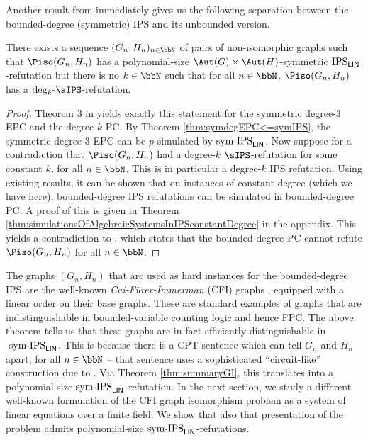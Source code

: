 \documentclass[a4paper,UKenglish,cleveref, autoref, thm-restate]{lipics-v2021}
\newcommand{\IPSlin}{\text{\upshape IPS}_{\mathsf{LIN}}}
\newcommand{\symIPSlin}{\text{ \upshape sym-IPS}_{\mathsf{LIN}}}
\begin{document}
Another result from \cite{Pago} immediately gives us the following separation between the bounded-degree (symmetric) IPS and its unbounded version.
\begin{theorem}
	\label{thm:separationOfSymBoundedDegree}
	There exists a sequence $(G_n,H_n)_{n \in \bbN}$ of pairs of non-isomorphic graphs such that $\Piso(G_n,H_n)$ has a polynomial-size $\Aut(G) \times \Aut(H)$-symmetric $\IPSlin$-refutation but there is no $k \in \bbN$ such that for all $n \in \bbN$, $\Piso(G_n,H_n)$ has a $\mathrm{deg}_k\text{-}\sIPS$-refutation.
\end{theorem}	
\begin{proof}
	Theorem 3 in \cite{Pago} yields exactly this statement for the symmetric degree-$3$ EPC and the degree-$k$ PC. 
	By Theorem \ref{thm:symdegEPC<=symIPS}, the symmetric degree-$3$ EPC can be $p$-simulated by$\symIPSlin{}$. Now suppose for a contradiction that $\Piso(G_n,H_n)$ had a degree-$k$ $\sIPS$-refutation for some constant $k$, for all $n \in \bbN$. This is in particular a degree-$k$ IPS refutation. 
	Using existing results, it can be shown that on instances of constant degree (which we have here), bounded-degree IPS refutations can be simulated in bounded-degree PC. A proof of this is given in Theorem \ref{thm:simulationsOfAlgebraicSystemsInIPSconstantDegree} in the appendix. This yields a contradiction to \cite[Theorem 3]{Pago}, which states that the bounded-degree PC cannot refute $\Piso(G_n,H_n)$ for all $n \in \bbN$.
\end{proof}	
The graphs $(G_n,H_n)$ that are used as hard instances for the bounded-degree IPS are the well-known \emph{Cai-Fürer-Immerman} (CFI) graphs \cite{GI, caifurimm92}, equipped with a linear order on their base graphs. These are standard examples of graphs that are indistinguishable in bounded-variable counting logic and hence FPC.
The above theorem tells us that these graphs are in fact efficiently distinguishable in$\symIPSlin$. This is because there is a CPT-sentence which can tell $G_n$ and $H_n$ apart, for all $n \in \bbN$ -- that sentence uses a sophisticated ``circuit-like'' construction due to \cite{dawar2008}. Via Theorem \ref{thm:summaryGI}, this translates into a polynomial-size$\symIPSlin{}$-refutation. In the next section, we study a different well-known formulation of the CFI graph isomorphism problem as a system of linear equations over a finite field. We show that also that presentation of the problem admits polynomial-size$\symIPSlin{}$-refutations.

\end{document}
